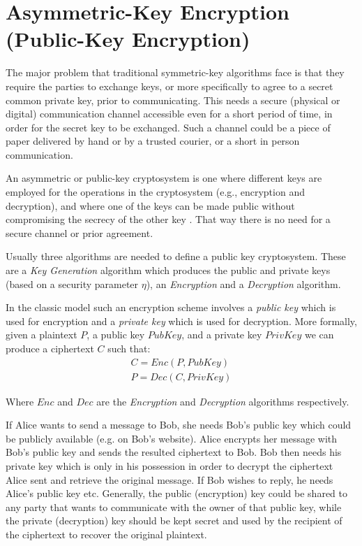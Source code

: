 \section{Asymmetric-Key Encryption (Public-Key Encryption)}\label{s:public-key-encryption}
The major problem that traditional symmetric-key algorithms face is that they require the parties to exchange keys, or more specifically to agree to a secret common private key, prior to communicating.
This needs a secure (physical or digital) communication channel accessible even for a short period of time, in order for the secret key to be exchanged. Such a channel could be a piece of paper delivered by hand or by a trusted courier, or a short in person communication.

An asymmetric or public-key cryptosystem is one where different keys are employed for the operations in the cryptosystem (e.g., encryption and decryption), and where one of the keys can be made public without compromising the secrecy of the other key \cite{Kaliski2011}. That way there is no need for a secure channel or prior agreement.

Usually three algorithms are needed to define a public key cryptosystem. These are a \textit{Key Generation} algorithm which produces the public and private keys (based on a security parameter $\eta$), an \textit{Encryption} and a \textit{Decryption} algorithm.

In the classic model such an encryption scheme involves a \textit{public key} which is used for encryption and a \textit{private key} which is used for decryption.
More formally, given a plaintext $P$, a public key $PubKey$, and a private key $PrivKey$ we can produce a ciphertext $C$ such that:
\begin{equation}
  \label{eq:public-key-encryption}
  \begin{aligned}
    C = Enc(P, PubKey)\\
    P = Dec(C, PrivKey)
  \end{aligned}
\end{equation}

Where $Enc$ and $Dec$ are the \textit{Encryption} and \textit{Decryption} algorithms respectively.

If Alice wants to send a message to Bob, she needs Bob's public key which could be publicly available (e.g. on Bob's website).
Alice encrypts her message with Bob's public key and sends the resulted ciphertext to Bob. Bob then needs his private key which is only in his possession in order to decrypt the ciphertext Alice sent and retrieve the original message.
If Bob wishes to reply, he needs Alice's public key etc.
Generally, the public (encryption) key could be shared to any party that wants to communicate with the owner of that public key, while the private (decryption) key should be kept secret and used by the recipient of the ciphertext to recover the original plaintext.

